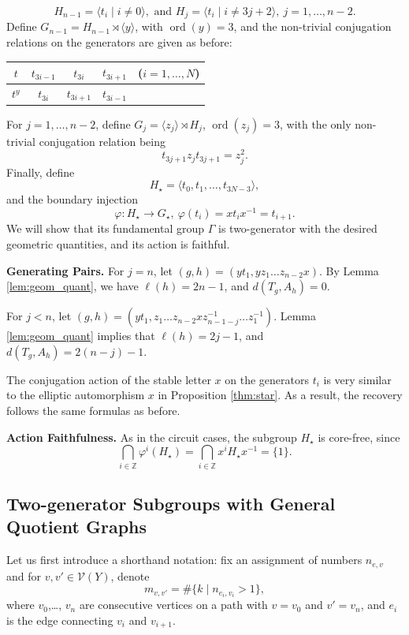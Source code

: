 \documentclass[12pt,leqno]{amsart}
\makeatletter
\renewenvironment{proof}[1][\proofname]{%
	\par
	\pushQED{\qed}%
	\normalfont
	\topsep6\p@\@plus6\p@\relax
	\trivlist
	\item[\hskip\labelsep\itshape #1\@addpunct{.}]%
	\ignorespaces
}{%
	\par\nobreak\vspace{2pt}%
	\popQED%
	\medskip%
	\endtrivlist
	\@endpefalse
}
\newcommand{\2}{L^2_{\rm per}(0, T)}
\newcommand{\ord}{{\operatorname{ord}}}
\numberwithin{equation}{section}
\numberwithin{figure}{section}
\makeatother
\begin{document}
\[
H_{n-1} = \langle t_i\mid i\neq 0\rangle,\text{ and }H_j = \langle t_i\mid i\neq 3j+2\rangle,\ j=1,\dots, n-2.
\]
Define $G_{n-1} = H_{n-1}\rtimes \langle y\rangle$, with $\ord(y) = 3$, and the non-trivial conjugation relations on the generators are given as before:
\begin{center}
    \begin{tabular}{c||c|c|cc}
        $t$ & $t_{3i-1}$ & $t_{3i}$ & $t_{3i+1}$ & ($i=1,\dots,N$) \\
        \hline
        $t^y$ & $t_{3i}$ & $t_{3i+1}$ & $t_{3i-1}$
    \end{tabular}
\end{center}
For $j=1,\dots, n-2$, define $G_j = \langle z_j\rangle\rtimes H_j$, $\ord(z_j) = 3$, with the only non-trivial conjugation relation being
\[
t_{3j+1}z_jt_{3j+1} = z_j^2.
\]
Finally, define
\[
H_\star = \langle t_0,t_1,\dots, t_{3N-3}\rangle,
\]
and the boundary injection
\[
\varphi: H_\star\to G_\star,\ \varphi(t_i) = xt_ix^{-1} = t_{i+1}.
\]
We will show that its fundamental group $\Gamma$ is two-generator with the desired geometric quantities, and its action is faithful.
\begin{proof}
    \textbf{Generating Pairs.} For $j=n$, let $(g,h) = (yt_1,yz_1\dots z_{n-2}x)$. By Lemma \ref{lem:geom_quant}, we have $\ell(h) = 2n-1$, and $d(T_g,A_h) = 0$. 

    For $j<n$, let $(g,h) = (yt_1, z_1\dots z_{n-2}xz_{n-1-j}^{-1}\dots z_1^{-1})$. Lemma \ref{lem:geom_quant} implies that $\ell(h) = 2j-1$, and $d(T_g,A_h) = 2(n-j)-1$.
    
    The conjugation action of the stable letter $x$ on the generators $t_i$ is very similar to the elliptic automorphism $x$ in Proposition \ref{thm:star}. As a result, the recovery follows the same formulas as before. 

    \textbf{Action Faithfulness.} As in the circuit cases, the subgroup $H_\star$ is core-free, since
    \[
    \bigcap_{i\in\mathbb{Z}}\varphi^i(H_\star) = \bigcap_{i\in\mathbb{Z}} x^i H_\star x^{-1} = \{1\}.
    \]
\end{proof}

\subsection{Two-generator Subgroups with General Quotient Graphs}
Let us first introduce a shorthand notation: fix an assignment of numbers $n_{e,v}$ and for $v,v'\in\mathcal{V}(Y)$, denote
\[
m_{v,v'} = \#\{k\mid n_{e_i,v_{i}} > 1\},
\]
where $v_0$,\dots, $v_n$ are consecutive vertices on a path with $v = v_0$ and $v' = v_n$, and $e_i$ is the edge connecting $v_i$ and $v_{i+1}$.
\end{document}
